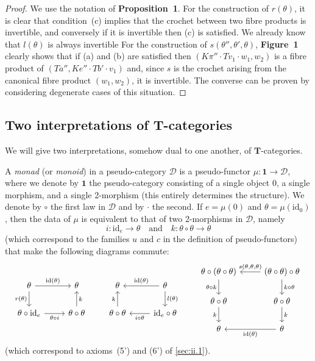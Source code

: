 \documentclass[fleqn]{article}
\newcommand{\oldpage}[1]{\marginpar{\footnotesize$\Big\vert$ \textit{p.~#1}}}
\newcommand{\unsure}[1]{{\color{purple}\textbf{#1}}}
\newcommand{\id}{\mathrm{id}}
\newcommand{\TT}{\mathbf{T}}
\newcommand{\textand}{\quad\text{and}\quad}
\newcommand{\cat}[1]{\mathcal{#1}}
\begin{document}
\begin{proof}
  \oldpage{257}
  We use the notation of \unsure{Proposition~1}.
  For the construction of $r(\theta)$, it is clear that condition~(c) implies that the crochet between two fibre products is invertible, and conversely if it is invertible then (c) is satisfied.
  We already know that $l(\theta)$ is always invertible
  For the construction of $s(\theta'',\theta',\theta)$, \unsure{Figure~1} clearly shows that if (a) and (b) are satisfied then $(K\pi''\cdot Tv_1\cdot w_1,w_2)$ is a fibre product of $(Ta'',Ke''\cdot Tb'\cdot v_1)$ and, since $s$ is the crochet arising from the canonical fibre product $(w_1,w_2)$, it is invertible.
  The converse can be proven by considering degenerate cases of this situation.
\end{proof}



\subsection{Two interpretations of $\TT$-categories}
\label{sec:ii.3}

We will give two interpretations, somehow dual to one another, of $\TT$-categories.

A \emph{monad} (or \emph{monoid}) in a pseudo-category $\cat{D}$ is a pseudo-functor $\mu\colon\mathbf{1}\to\cat{D}$, where we denote by $\mathbf{1}$ the pseudo-category consisting of a single object $0$, a single morphism, and a single 2-morphism (this entirely determines the structure).
We denote by $\circ$ the first law in $\cat{D}$ and by $\cdot$ the second.
If $e=\mu(0)$ and $\theta=\mu(\id_0)$, then the data of $\mu$ is equivalent to that of two 2-morphisms in $\cat{D}$, namely
\[
  i\colon\id_e\to\theta
  \textand
  k\colon\theta\circ\theta\to\theta
\]
(which correspond to the families $u$ and $c$ in the definition of pseudo-functors) that make the following diagrams commute:
\[
  \begin{tikzcd}
    \theta
      \ar[r,"\id(\theta)"]
      \ar[d,swap,"r(\theta)"]
    & \theta
  \\\theta\circ\id_e
      \ar[r,swap,"\theta\circ i"]
    & \theta\circ\theta
      \ar[u,swap,"k"]
  \end{tikzcd}
  \qquad
  \begin{tikzcd}
    \theta
    & \theta
        \ar[l,swap,"\id(\theta)"]
        \ar[d,"l(\theta)"]
  \\\theta\circ\theta
        \ar[u,"k"]
    & \id_e\circ\theta
        \ar[l,"i\circ\theta"]
  \end{tikzcd}
  \qquad
  \begin{tikzcd}
    \theta\circ(\theta\circ\theta)
      \ar[d,swap,"\theta\circ k"]
    & (\theta\circ\theta)\circ\theta
      \ar[l,swap,"{s(\theta,\theta,\theta)}"]
      \ar[d,"k\circ\theta"]
  \\\theta\circ\theta
      \ar[d,swap,"k"]
    & \theta\circ\theta
      \ar[d,"k"]
  \\ \theta
    & \theta
      \ar[l,"\id(\theta)"]
  \end{tikzcd}
\]
(which correspond to axioms~(5') and (6') of \cref{sec:ii.1}).
\end{document}
